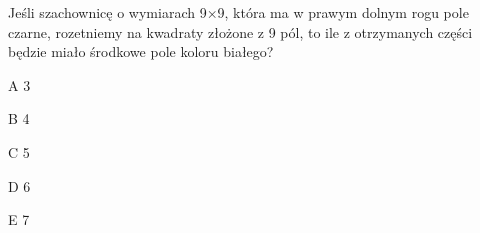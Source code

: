 \begin{tresc}
Jeśli szachownicę o wymiarach 9×9, która ma w prawym dolnym rogu pole czarne, rozetniemy na kwadraty złożone z 9 pól, to ile z otrzymanych części będzie miało środkowe pole koloru białego?
\end{tresc}
\begin{wariant}{A} 3 \end{wariant}
\begin{wariant}{B} 4 \end{wariant}
\begin{wariant}{C} 5 \end{wariant}
\begin{wariant}{D} 6 \end{wariant}
\begin{wariant}{E} 7 \end{wariant}
